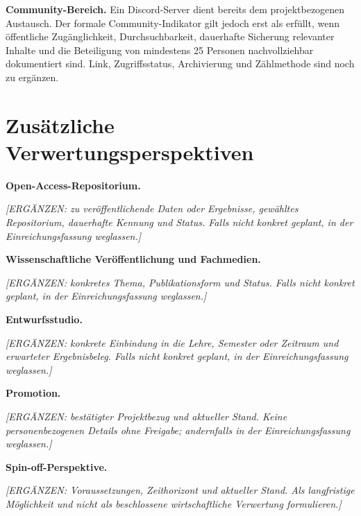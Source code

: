 \documentclass[type=zwischenbericht,theme=dark]{zukunftbau}
\begin{document}
\textbf{Community-Bereich.} Ein Discord-Server dient bereits dem projektbezogenen Austausch. Der formale Community-Indikator gilt jedoch erst als erfüllt, wenn öffentliche Zugänglichkeit, Durchsuchbarkeit, dauerhafte Sicherung relevanter Inhalte und die Beteiligung von mindestens 25 Personen nachvollziehbar dokumentiert sind. Link, Zugriffsstatus, Archivierung und Zählmethode sind noch zu ergänzen.

\section{Zusätzliche Verwertungsperspektiven}

\textbf{Open-Access-Repositorium.}
\begin{Blockquote}
\textit{[ERGÄNZEN: zu veröffentlichende Daten oder Ergebnisse, gewähltes Repositorium, dauerhafte Kennung und Status. Falls nicht konkret geplant, in der Einreichungsfassung weglassen.]}
\end{Blockquote}

\textbf{Wissenschaftliche Veröffentlichung und Fachmedien.}
\begin{Blockquote}
\textit{[ERGÄNZEN: konkretes Thema, Publikationsform und Status. Falls nicht konkret geplant, in der Einreichungsfassung weglassen.]}
\end{Blockquote}

\textbf{Entwurfsstudio.}
\begin{Blockquote}
\textit{[ERGÄNZEN: konkrete Einbindung in die Lehre, Semester oder Zeitraum und erwarteter Ergebnisbeleg. Falls nicht konkret geplant, in der Einreichungsfassung weglassen.]}
\end{Blockquote}

\textbf{Promotion.}
\begin{Blockquote}
\textit{[ERGÄNZEN: bestätigter Projektbezug und aktueller Stand. Keine personenbezogenen Details ohne Freigabe; andernfalls in der Einreichungsfassung weglassen.]}
\end{Blockquote}

\textbf{Spin-off-Perspektive.}
\begin{Blockquote}
\textit{[ERGÄNZEN: Voraussetzungen, Zeithorizont und aktueller Stand. Als langfristige Möglichkeit und nicht als beschlossene wirtschaftliche Verwertung formulieren.]}
\end{Blockquote}

\makeappendices
{}




\listofappendices
\listofglossaries
\listofabbreviations
\SemioReferences
\end{document}

